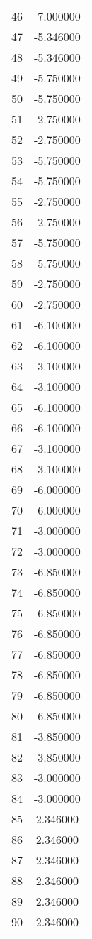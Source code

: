 \documentclass[12pt]{article}
\begin{document}
\begin{longtable}{@{}cc@{}}
46 & -7.000000 \\
47 & -5.346000 \\
48 & -5.346000 \\
49 & -5.750000 \\
50 & -5.750000 \\
51 & -2.750000 \\
52 & -2.750000 \\
53 & -5.750000 \\
54 & -5.750000 \\
55 & -2.750000 \\
56 & -2.750000 \\
57 & -5.750000 \\
58 & -5.750000 \\
59 & -2.750000 \\
60 & -2.750000 \\
61 & -6.100000 \\
62 & -6.100000 \\
63 & -3.100000 \\
64 & -3.100000 \\
65 & -6.100000 \\
66 & -6.100000 \\
67 & -3.100000 \\
68 & -3.100000 \\
69 & -6.000000 \\
70 & -6.000000 \\
71 & -3.000000 \\
72 & -3.000000 \\
73 & -6.850000 \\
74 & -6.850000 \\
75 & -6.850000 \\
76 & -6.850000 \\
77 & -6.850000 \\
78 & -6.850000 \\
79 & -6.850000 \\
80 & -6.850000 \\
81 & -3.850000 \\
82 & -3.850000 \\
83 & -3.000000 \\
84 & -3.000000 \\
85 & 2.346000 \\
86 & 2.346000 \\
87 & 2.346000 \\
88 & 2.346000 \\
89 & 2.346000 \\
90 & 2.346000 \\

\end{longtable}
\end{document}
